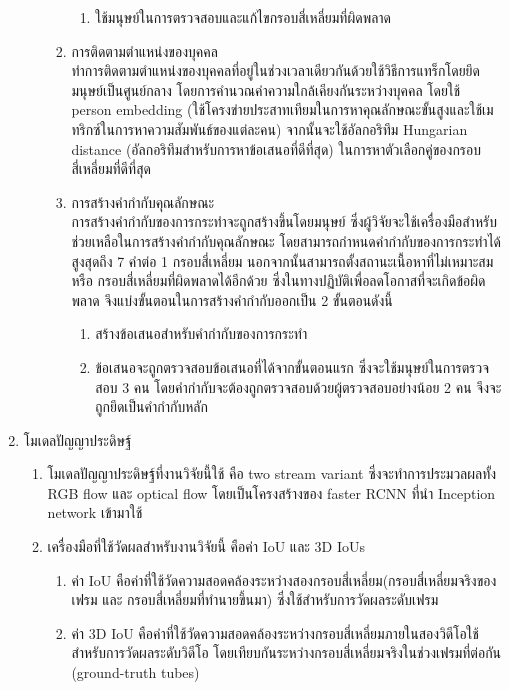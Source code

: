 \begin{enumerate}
\begin{enumerate}
\begin{enumerate}
\begin{enumerate}
				\item ใช้มนุษย์ในการตรวจสอบและแก้ไขกรอบสี่เหลี่ยมที่ผิดพลาด
			\end{enumerate}	
			\item การติดตามตำแหน่งของบุคคล\\
			ทำการติดตามตำแหน่งของบุคคลที่อยู่ในช่วงเวลาเดียวกันด้วยใช้วิธีการแทร็กโดยยึดมนุษย์เป็นศูนย์กลาง โดยการคำนวณค่าความใกล้เคียงกันระหว่างบุคคล 
			โดยใช้ person embedding (ใช้โครงข่ายประสาทเทียมในการหาคุณลักษณะขั้นสูงและใช้เมทริกซ์ในการหาความสัมพันธ์ของแต่ละคน) จากนั้นจะใช้อัลกอริทึม Hungarian distance (อัลกอริทึมสำหรับการหาข้อเสนอที่ดีที่สุด) ในการหาตัวเลือกคู่ของกรอบสี่เหลี่ยมที่ดีที่สุด
			\item การสร้างคำกำกับคุณลักษณะ\\
			การสร้างคำกำกับของการกระทำจะถูกสร้างขึ้นโดยมนุษย์ ซึ่งผู้วิจัยจะใช้เครื่องมือสำหรับช่วยเหลือในการสร้างคำกำกับคุณลักษณะ โดยสามารถกำหนดคำกำกับของการกระทำได้สูงสุดถึง 7 คำต่อ 1 กรอบสี่เหลี่ยม นอกจากนั้นสามารถตั้งสถานะเนื้อหาที่ไม่เหมาะสม หรือ กรอบสี่เหลี่ยมที่ผิดพลาดได้อีกด้วย ซึ่งในทางปฏิบัติเพื่อลดโอกาสที่จะเกิดข้อผิดพลาด จึงแบ่งขั้นตอนในการสร้างคำกำกับออกเป็น 2 ขั้นตอนดังนี้
			\begin{enumerate}
				\setlength\itemsep{-0.25em}
				\item สร้างข้อเสนอสำหรับคำกำกับของการกระทำ
				\item ข้อเสนอจะถูกตรวจสอบข้อเสนอที่ได้จากขั้นตอนแรก ซึ่งจะใช้มนุษย์ในการตรวจสอบ 3 คน โดยคำกำกับจะต้องถูกตรวจสอบด้วยผู้ตรวจสอบอย่างน้อย 2 คน จึงจะถูกยึดเป็นคำกำกับหลัก
			\end{enumerate}
		\end{enumerate}
	\end{enumerate}
	\item {โมเดลปัญญาประดิษฐ์}
	\begin{enumerate}
		\item โมเดลปัญญาประดิษฐ์ที่งานวิจัยนี้ใช้ คือ two stream variant ซึ่งจะทำการประมวลผลทั้ง RGB flow และ optical flow 
		โดยเป็นโครงสร้างของ faster RCNN ที่นำ Inception network เข้ามาใช้
		\item เครื่องมือที่ใช้วัดผลสำหรับงานวิจัยนี้ คือค่า IoU และ 3D IoUs 
		\begin{enumerate}
			\item ค่า IoU คือค่าที่ใช้วัดความสอดคล้องระหว่างสองกรอบสี่เหลี่ยม(กรอบสี่เหลี่ยมจริงของเฟรม และ กรอบสี่เหลี่ยมที่ทำนายขึ้นมา) ซึ่งใช้สำหรับการวัดผลระดับเฟรม 
			\item ค่า 3D IoU คือค่าที่ใช้วัดความสอดคล้องระหว่างกรอบสี่เหลี่ยมภายในสองวิดีโอใช้สำหรับการวัดผลระดับวิดีโอ โดยเทียบกันระหว่างกรอบสี่เหลี่ยมจริงในช่วงเฟรมที่ต่อกัน (ground-truth tubes) 

\end{enumerate}
\end{enumerate}
\end{enumerate}
